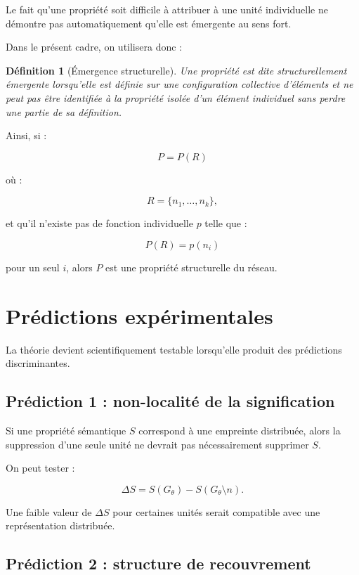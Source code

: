 \documentclass[11pt,a4paper]{article}
\newtheorem{definition}{Définition}[section]
\begin{document}
Le fait qu'une propriété soit difficile à attribuer à une unité individuelle
ne démontre pas automatiquement qu'elle est émergente au sens fort.

Dans le présent cadre, on utilisera donc :

\begin{definition}[Émergence structurelle]
Une propriété est dite structurellement émergente lorsqu'elle est définie
sur une configuration collective d'éléments et ne peut pas être identifiée
à la propriété isolée d'un élément individuel sans perdre une partie de sa
définition.
\end{definition}

Ainsi, si :

\[
P=P(R)
\]

où :

\[
R=\{n_1,\ldots,n_k\},
\]

et qu'il n'existe pas de fonction individuelle $p$ telle que :

\[
P(R)=p(n_i)
\]

pour un seul $i$, alors $P$ est une propriété structurelle du réseau.

\section{Prédictions expérimentales}

La théorie devient scientifiquement testable lorsqu'elle produit des
prédictions discriminantes.

\subsection{Prédiction 1 : non-localité de la signification}

Si une propriété sémantique $S$ correspond à une empreinte distribuée, alors
la suppression d'une seule unité ne devrait pas nécessairement supprimer
$S$.

On peut tester :

\[
\Delta S
=
S(G_\theta)-S(G_\theta\setminus n).
\]

Une faible valeur de $\Delta S$ pour certaines unités serait compatible
avec une représentation distribuée.

\subsection{Prédiction 2 : structure de recouvrement}
\end{document}
